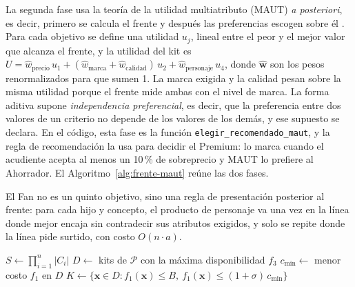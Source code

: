 La segunda fase usa la teoría de la utilidad multiatributo (MAUT) \citep{keeney_decisions_1976}
\emph{a posteriori}, es decir, primero se calcula el frente y después las preferencias escogen sobre
él \citep{miettinen_nonlinear_1999}. Para cada objetivo se define una utilidad $u_j$, lineal entre
el peor y el mejor valor que alcanza el frente, y la utilidad del kit es
$U=\hat w_{\mathrm{precio}}\,u_1+(\hat w_{\mathrm{marca}}+\hat w_{\mathrm{calidad}})\,u_2+\hat w_{\mathrm{personaje}}\,u_4$,
donde $\hat{\mathbf{w}}$ son los pesos renormalizados para que sumen 1. La marca exigida y la
calidad pesan sobre la misma utilidad porque el frente mide ambas con el nivel de marca. La forma
aditiva supone \emph{independencia preferencial}, es decir, que la preferencia entre dos valores de
un criterio no depende de los valores de los demás, y ese supuesto se declara. En el código, esta
fase es la función \texttt{elegir\_recomendado\_maut}, y la regla de recomendación la usa para
decidir el Premium: lo marca cuando el acudiente acepta al menos un 10\,\% de sobreprecio y MAUT lo
prefiere al Ahorrador. El Algoritmo~\ref{alg:frente-maut} reúne las dos fases.

El Fan no es un quinto objetivo, sino una regla de presentación posterior al frente: para cada hijo
y concepto, el producto de personaje va una vez en la línea donde mejor encaja sin contradecir sus
atributos exigidos, y solo se repite donde la línea pide surtido, con costo $O(n\cdot a)$.

\begin{algorithm}[H]
\caption{Construcción del frente y selección del kit recomendado}
\label{alg:frente-maut}
$S \leftarrow \prod_{i=1}^{n}|C_i|$\;
$D\leftarrow$ kits de $\mathcal{P}$ con la máxima disponibilidad $f_3$ 
$c_{\min}\leftarrow$ menor costo $f_1$ en $D$\;
$K\leftarrow\{\mathbf{x}\in D : f_1(\mathbf{x})\leq B,\ f_1(\mathbf{x})\leq(1+\sigma)\,c_{\min}\}$\;
 
\end{algorithm}

